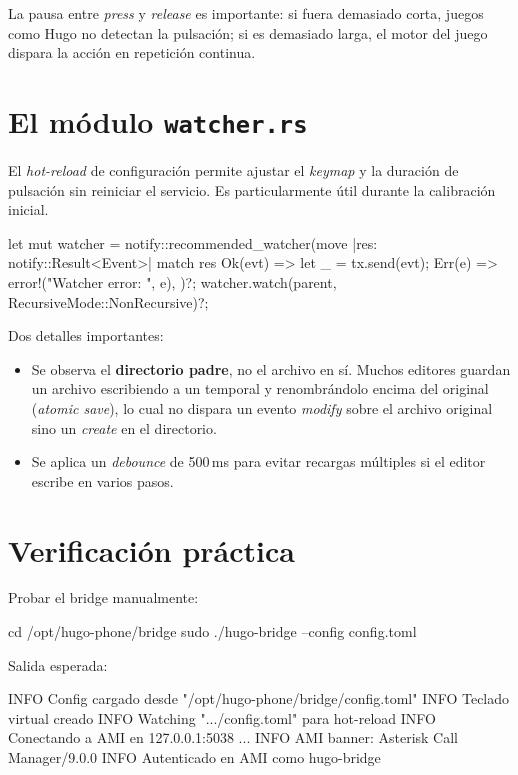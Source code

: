 La pausa entre \emph{press} y \emph{release} es importante: si fuera demasiado corta, juegos como Hugo no detectan la pulsación; si es demasiado larga, el motor del juego dispara la acción en repetición continua.

\section{El módulo \texttt{watcher.rs}}

El \emph{hot-reload} de configuración permite ajustar el \emph{keymap} y la duración de pulsación sin reiniciar el servicio. Es particularmente útil durante la calibración inicial.

\begin{rustcode}
let mut watcher = notify::recommended_watcher(move |res: notify::Result<Event>| {
    match res {
        Ok(evt) => { let _ = tx.send(evt); }
        Err(e) => error!("Watcher error: {}", e),
    }
})?;
watcher.watch(parent, RecursiveMode::NonRecursive)?;
\end{rustcode}

Dos detalles importantes:

\begin{itemize}
  \item Se observa el \textbf{directorio padre}, no el archivo en sí. Muchos editores guardan un archivo escribiendo a un temporal y renombrándolo encima del original (\emph{atomic save}), lo cual no dispara un evento \emph{modify} sobre el archivo original sino un \emph{create} en el directorio.
  \item Se aplica un \emph{debounce} de 500\,ms para evitar recargas múltiples si el editor escribe en varios pasos.
\end{itemize}

\section{Verificación práctica}

Probar el bridge manualmente:

\begin{shellcode}
cd /opt/hugo-phone/bridge
sudo ./hugo-bridge --config config.toml
\end{shellcode}

Salida esperada:

\begin{plaincode}
INFO Config cargado desde "/opt/hugo-phone/bridge/config.toml"
INFO Teclado virtual creado
INFO Watching ".../config.toml" para hot-reload
INFO Conectando a AMI en 127.0.0.1:5038 ...
INFO AMI banner: Asterisk Call Manager/9.0.0
INFO Autenticado en AMI como hugo-bridge
\end{plaincode}

